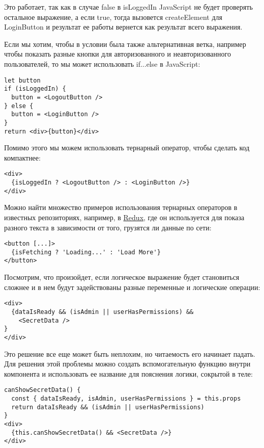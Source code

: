 Это работает, так как в случае false в isLoggedIn JavaScript не будет проверять остальное выражение, а если true, тогда вызовется createElement для LoginButton и результат ее работы вернется как результат всего выражения.

Если мы хотим, чтобы в условии была также альтернативная ветка, например чтобы показать разные кнопки для авторизованного и неавторизованного пользователей, то мы может использовать if...else в JavaScript:

\begin{lstlisting}
let button
if (isLoggedIn) {
  button = <LogoutButton />
} else {
  button = <LoginButton />
}
return <div>{button}</div>
\end{lstlisting}
   
Помимо этого мы можем использовать тернарный оператор, чтобы сделать код компактнее:

\begin{lstlisting}
<div>
  {isLoggedIn ? <LogoutButton /> : <LoginButton />}
</div>
\end{lstlisting}

Можно найти множество примеров использования тернарных операторов в известных репозиториях, например, в \href{https://github.com/reactjs/redux/blob/master/examples/real-world/src/components/List.js\#L25}{Redux}, где он используется для показа разного текста в зависимости от того, грузятся ли данные по сети:

\begin{lstlisting}
<button [...]>
  {isFetching ? 'Loading...' : 'Load More'}
</button>
\end{lstlisting}

Посмотрим, что произойдет, если логическое выражение будет становиться сложнее и в нем будут задействованы разные переменные и логические операции:

\begin{lstlisting}
<div>
  {dataIsReady && (isAdmin || userHasPermissions) && 
    <SecretData />
}
</div>
\end{lstlisting}

Это решение все еще может быть неплохим, но читаемость его начинает падать. Для решения этой проблемы можно создать вспомогательную функцию внутри компонента и использовать ее название для пояснения логики, сокрытой в теле:

\begin{lstlisting}
canShowSecretData() {
  const { dataIsReady, isAdmin, userHasPermissions } = this.props
  return dataIsReady && (isAdmin || userHasPermissions)
}
<div>
  {this.canShowSecretData() && <SecretData />}
</div>
\end{lstlisting}

